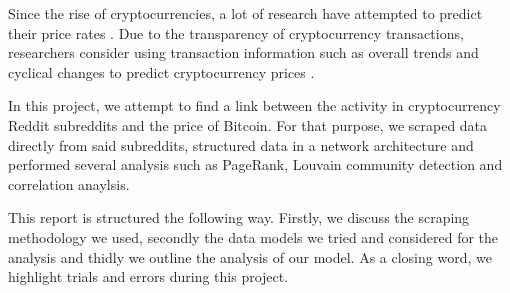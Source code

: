 Since the rise of cryptocurrencies, a lot of research have attempted to predict their price rates \cite{kooPredictionBitcoinPrice2021,coccoPredictionsBitcoinPrices2021,liMultiwindowBitcoinPrice2021}. Due to the transparency of cryptocurrency transactions, researchers consider using transaction information such as overall trends and cyclical changes to predict cryptocurrency prices \cite{liCrossCryptocurrencyRelationship2022}.

In this project, we attempt to find a link between the activity in cryptocurrency Reddit subreddits and the price of Bitcoin. For that purpose, we scraped data directly from said subreddits, structured data in a network architecture and performed several analysis such as PageRank, Louvain community detection and correlation anaylsis.

This report is structured the following way. Firstly, we discuss the scraping methodology we used, secondly the data models we tried and considered for the analysis and thidly we outline the analysis of our model. As a closing word, we highlight trials and errors during this project.
